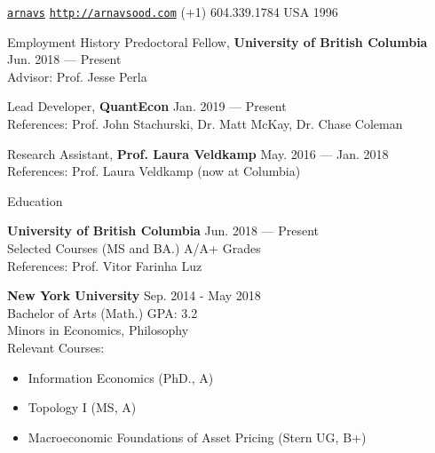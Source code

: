 \documentclass{resume} %
\begin{document}
 \href{https://github.com/arnavs}{\tt arnavs} \vline \hspace{0.5 em} {} \href{http://arnavsood.com}{\tt http://arnavsood.com} \vline \hspace{0.5 em}  (+1) 604.339.1784 \vline \hspace{0.5 em}  USA \vline \hspace{0.5 em}  1996

\begin{rSection}{Employment History}
Predoctoral Fellow, {\bf University of British Columbia} \hfill {Jun. 2018 --- Present} 
\\ Advisor: Prof. Jesse Perla \smallskip 

Lead Developer, {\bf QuantEcon} \hfill {Jan. 2019 --- Present}
\\ References: Prof. John Stachurski, Dr. Matt McKay, Dr. Chase Coleman

Research Assistant, {\bf Prof. Laura Veldkamp} \hfill {May. 2016 --- Jan. 2018}
\\ References: Prof. Laura Veldkamp (now at Columbia)
\end{rSection}


\begin{rSection}{Education}

{\bf University of British Columbia} \hfill {Jun. 2018 --- Present} 
\\ Selected Courses (MS and BA.)  \hfill { A/A+ Grades }
\\ References: Prof. Vitor Farinha Luz

{\bf New York University} \hfill {Sep. 2014 - May 2018} 
\\ Bachelor of Arts (Math.) \hfill { GPA: 3.2 } 
\\ Minors in Economics, Philosophy 
\\ Relevant Courses: 
\begin{itemize}[noitemsep, nolistsep]
    \item Information Economics (PhD., A) 
    \item Topology I (MS, A)
    \item Macroeconomic Foundations of Asset Pricing (Stern UG, B+)
\end{itemize}

\end{rSection}
\end{document}
